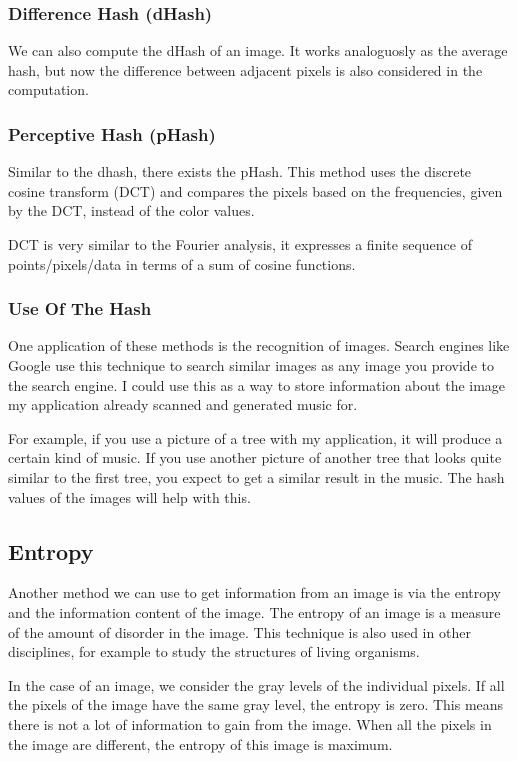 \documentclass[12pt]{article}
\begin{document}
\subsubsection{Difference Hash (dHash)}
We can also compute the dHash of an image. It works analoguosly as the average hash, but now the difference between adjacent pixels is also considered in the computation.

\subsubsection{Perceptive Hash (pHash)}
Similar to the dhash, there exists the pHash. This method uses the discrete cosine transform (DCT) and compares the pixels based on the frequencies, given by the DCT, instead of the color values.

DCT is very similar to the Fourier analysis, it expresses a finite sequence of points/pixels/data in terms of a sum of cosine functions.

\subsubsection{Use Of The Hash}
One application of these methods is the recognition of images. Search engines like Google use this technique to search similar images as any image you provide to the search engine. I could use this as a way to store information about the image my application already scanned and generated music for.

For example, if you use a picture of a tree with my application, it will produce a certain kind of music. If you use another picture of another tree that looks quite similar to the first tree, you expect to get a similar result in the music. The hash values of the images will help with this. 

\subsection{Entropy}

Another method we can use to get information from an image is via the entropy and the information content of the image.
The entropy of an image is a measure of the amount of disorder in the image. This technique is also used in other disciplines, for example to study the structures of living organisms.

In the case of an image, we consider the gray levels of the individual pixels. If all the pixels of the image have the same gray level, the entropy is zero. This means there is not a lot of information to gain from the image. When all the pixels in the image are different, the entropy of this image is maximum.
\end{document}

